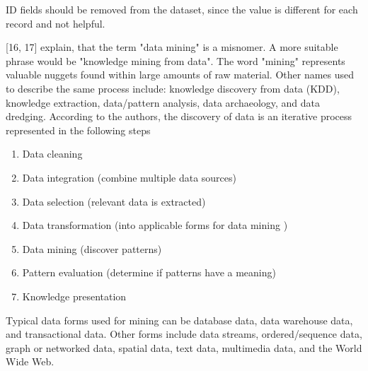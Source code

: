 ID fields should be removed from the dataset, since the value is different for each record and not helpful.







\textcite{han2011data}[16, 17] explain, that the term "data mining" is a misnomer. A more suitable phrase would be "knowledge mining from data". The word "mining" represents valuable nuggets found within large amounts of raw material. Other names used to describe the same process include: knowledge discovery from data (KDD), knowledge extraction, data/pattern analysis, data archaeology, and data dredging.
According to the authors, the discovery of data is an iterative process represented in the following steps

\begin{enumerate}
  \item Data cleaning
  \item Data integration (combine multiple data sources)
  \item Data selection (relevant data is extracted)
  \item Data transformation (into applicable forms for data mining )
  \item Data mining (discover patterns)
  \item Pattern evaluation (determine if patterns have a meaning)
  \item Knowledge presentation
\end{enumerate}

Typical data forms used for mining can be database data, data warehouse data, and transactional data. Other forms include data streams, ordered/sequence data, graph or networked data, spatial data, text data, multimedia data, and the World Wide Web.

